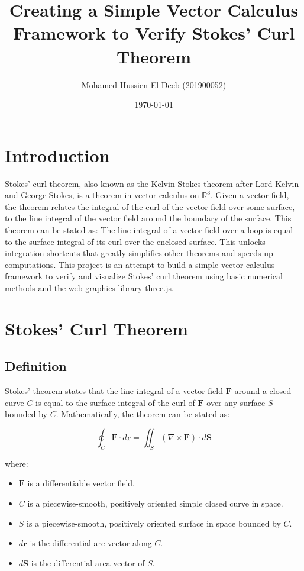 \documentclass[12pt]{article}
\title{Creating a Simple Vector Calculus Framework to Verify Stokes' Curl Theorem}
\author{Mohamed Hussien El-Deeb (201900052)}
\date{\today}
\begin{document}
\maketitle
\tableofcontents
\hypersetup{linkcolor=RoyalBlue4}

\newpage
\section{Introduction}

Stokes' curl theorem, also known as the Kelvin-Stokes theorem after \href{https://en.wikipedia.org/wiki/Lord_Kelvin}{Lord Kelvin} and
\href{https://en.wikipedia.org/wiki/Sir_George_Stokes,_1st_Baronet}{George Stokes}, is a theorem in vector calculus on \({\displaystyle \mathbb {R} ^{3}}\). Given
a vector field, the theorem relates the integral of the curl of the vector field over some
surface, to the line integral of the vector field around the boundary of the surface. This theorem can be
stated as: The line integral of a vector field over a loop is equal to the surface
integral of its curl over the enclosed surface. This unlocks integration shortcuts that greatly simplifies other theorems and speeds up computations.
This project is an attempt to build a simple vector calculus framework to verify and visualize
Stokes' curl theorem using basic numerical methods and the web graphics library \href{https://threejs.org/}{three.js}.

\newpage
\section{Stokes' Curl Theorem}
\subsection{Definition}

Stokes' theorem states that the line integral of a vector field \(\mathbf{F}\) around a closed curve \(C\) is equal to the surface integral of the curl of \(\mathbf{F}\) over any surface \(S\) bounded by \(C\). Mathematically, the theorem can be stated as:

\[
    \oint_{C} \mathbf{F} \cdot d\mathbf{r} = \iint_{S} (\nabla \times \mathbf{F}) \cdot d\mathbf{S}
\]

where:

\begin{itemize}
    \item \(\mathbf{F}\) is a differentiable vector field.
    \item \(C\) is a piecewise-smooth, positively oriented simple closed curve in space.
    \item \(S\) is a piecewise-smooth, positively oriented surface in space bounded by \(C\).
    \item \(d\mathbf{r}\) is the differential arc vector along \(C\).
    \item \(d\mathbf{S}\) is the differential area vector of \(S\).
\end{itemize}
\end{document}

